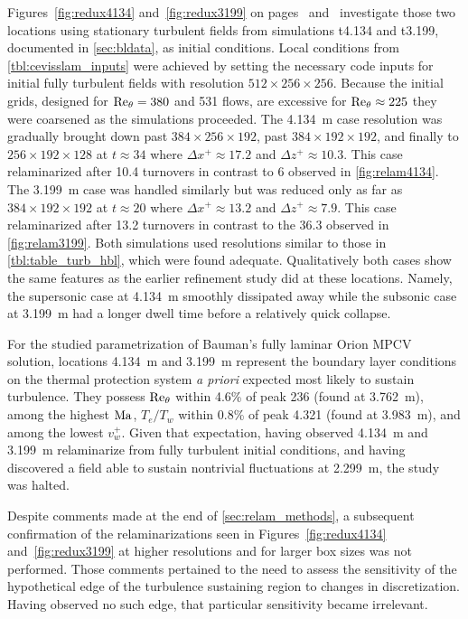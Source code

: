 Figures~\ref{fig:redux4134} and~\ref{fig:redux3199} on
pages~\pageref{fig:redux4134} and~\pageref{fig:redux3199} investigate those
two locations using stationary turbulent fields from simulations t4.134 and
t3.199, documented in \autoref{sec:bldata}, as initial conditions.
%
Local conditions from \autoref{tbl:cevisslam_inputs} were achieved by setting
the necessary code inputs for initial fully turbulent fields with resolution
$512\times{}256\times{}256$.
%
Because the initial grids, designed for $\Reynolds[\theta]{}=380$ and
531 flows, are excessive for $\Reynolds[\theta]{}\approx225$ they were
coarsened as the simulations proceeded.
%
The 4.134~m case resolution was gradually brought down past
$384\times{}256\times{}192$, past $384\times{}192\times{}192$, and
finally to $256\times{}192\times{}128$ at $t\approx{}34$ where
$\Delta{}x^{+}\approx{}17.2$ and $\Delta{}z^{+}\approx{}10.3$.
%
This case relaminarized after 10.4 turnovers in contrast to 6 observed in
\autoref{fig:relam4134}.
%
The 3.199~m case was handled similarly but was reduced only as
far as $384\times{}192\times{}192$ at $t\approx{}20$ where
$\Delta{}x^{+}\approx{}13.2$ and $\Delta{}z^{+}\approx{}7.9$.
%
This case relaminarized after 13.2 turnovers in contrast to the 36.3 observed in
\autoref{fig:relam3199}.
%
Both simulations used resolutions similar to those in
\autoref{tbl:table_turb_hbl}, which were found adequate.
%
Qualitatively both cases show the same features as the earlier refinement study
did at these locations.  Namely, the supersonic case at 4.134~m smoothly
dissipated away while the subsonic case at 3.199~m had a longer dwell time
before a relatively quick collapse.

For the studied parametrization of Bauman's fully laminar Orion MPCV solution,
locations 4.134~m and 3.199~m represent the boundary layer conditions on the
thermal protection system \emph{a priori} expected most likely to sustain
turbulence.  They possess $\Reynolds[\theta]{}$ within 4.6\% of peak 236 (found
at 3.762~m), among the highest $\Mach$, $T_e/T_w$ within 0.8\% of peak 4.321
(found at 3.983~m), and among the lowest $v_w^{+}$.
%
Given that expectation, having observed 4.134~m and 3.199~m relaminarize from
fully turbulent initial conditions, and having discovered a field
able to sustain nontrivial fluctuations at 2.299~m, the study was halted.

Despite comments made at the end of \autoref{sec:relam_methods}, a subsequent
confirmation of the relaminarizations seen in Figures~\ref{fig:redux4134}
and~\ref{fig:redux3199} at higher resolutions and for larger box sizes was
not performed.  Those comments pertained to the need to assess the sensitivity
of the hypothetical edge of the turbulence sustaining region to changes in
discretization.  Having observed no such edge, that particular sensitivity
became irrelevant.

